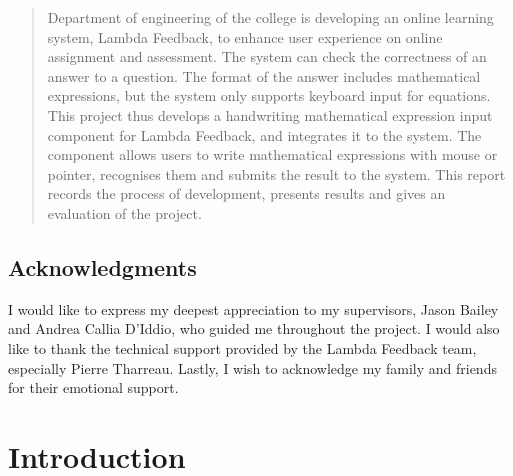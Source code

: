 \documentclass[12pt,twoside]{report}
\date{\today}
\begin{document}



\clearpage{\pagestyle{empty}\cleardoublepage}
\setcounter{page}{1}
\pagestyle{fancy}

\begin{abstract}
Department of engineering of the college is developing an online learning system, Lambda
Feedback, to enhance user experience on online assignment and assessment. The
system can check the correctness of an answer to a question. The format of the
answer includes mathematical expressions, but the system only supports keyboard
input for equations. This project thus develops a handwriting mathematical
expression input component for Lambda Feedback, and integrates it to the system.
The component allows users to write mathematical expressions with mouse or pointer, recognises them and submits the result to the system. This report records the process of development, presents results and gives an evaluation of the project.
\end{abstract}

\cleardoublepage
\section*{Acknowledgments}
I would like to express my deepest appreciation to my supervisors, Jason Bailey and Andrea Callia D'Iddio, who guided me throughout the project. I would also like to thank the technical support provided by the Lambda Feedback team, especially Pierre Tharreau. Lastly, I wish to acknowledge my family and friends for their emotional support.

\clearpage{\pagestyle{empty}\cleardoublepage}

\tableofcontents 


\clearpage{\pagestyle{empty}\cleardoublepage}
\setcounter{page}{1}
\fancyhead[LE,RO]{\slshape \rightmark}
\fancyhead[LO,RE]{\slshape \leftmark}

\chapter{Introduction}
\label{Introduction}

\end{document}
